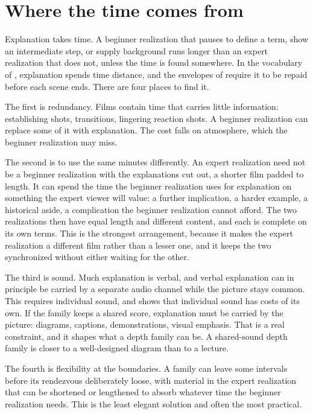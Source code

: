 \section{Where the time comes from}

Explanation takes time. A beginner realization that pauses to define a term, show an intermediate step, or supply background runs longer than an expert realization that does not, unless the time is found somewhere. In the vocabulary of , explanation spends time distance, and the envelopes of  require it to be repaid before each scene ends. There are four places to find it.

The first is redundancy. Films contain time that carries little information: establishing shots, transitions, lingering reaction shots. A beginner realization can replace some of it with explanation. The cost falls on atmosphere, which the beginner realization may miss.

The second is to use the same minutes differently. An expert realization need not be a beginner realization with the explanations cut out, a shorter film padded to length. It can spend the time the beginner realization uses for explanation on something the expert viewer will value: a further implication, a harder example, a historical aside, a complication the beginner realization cannot afford. The two realizations then have equal length and different content, and each is complete on its own terms. This is the strongest arrangement, because it makes the expert realization a different film rather than a lesser one, and it keeps the two synchronized without either waiting for the other.

The third is sound. Much explanation is verbal, and verbal explanation can in principle be carried by a separate audio channel while the picture stays common. This requires individual sound, and  shows that individual sound has costs of its own. If the family keeps a shared score, explanation must be carried by the picture: diagrams, captions, demonstrations, visual emphasis. That is a real constraint, and it shapes what a depth family can be. A shared-sound depth family is closer to a well-designed diagram than to a lecture.

The fourth is flexibility at the boundaries. A family can leave some intervals before its rendezvous deliberately loose, with material in the expert realization that can be shortened or lengthened to absorb whatever time the beginner realization needs. This is the least elegant solution and often the most practical.

